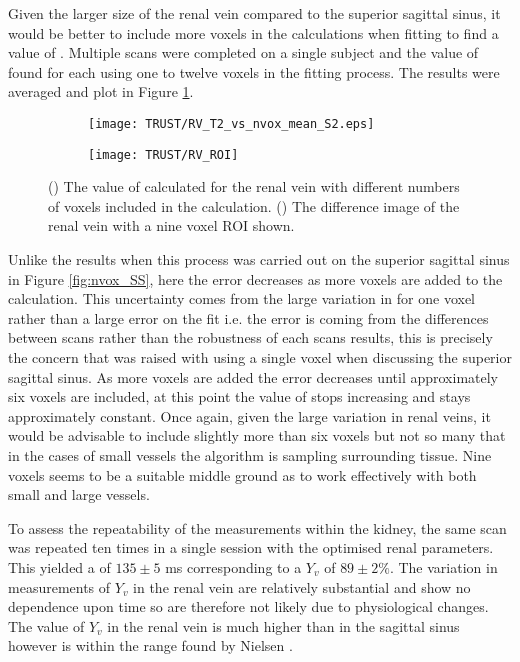 Given the larger size of the renal vein compared to the superior sagittal sinus, it would be better to include more voxels in the calculations when fitting to find a value of \ttwo. Multiple scans were completed on a single subject and the value of \ttwo found for each using one to twelve voxels in the fitting process. The results were averaged and plot in Figure \ref{fig:nvox_RV}.

\begin{figure}[H]
	\centering
	\begin{subfigure}[c]{0.47\textwidth}
		\centering
		\texttt{[image: TRUST/RV\_T2\_vs\_nvox\_mean\_S2.eps]}
		\caption{}
		\label{fig:nvox_RV}
	\end{subfigure}
	\hfill
	\begin{subfigure}[c]{0.47\textwidth}
		\centering
		\texttt{[image: TRUST/RV\_ROI]}
		\caption{}
		\label{fig:RV_ROI}
	\end{subfigure}
	\caption{() The value of \ttwo calculated for the renal vein with different numbers of voxels included in the calculation. () The difference image of the renal vein with a nine voxel \ac{ROI} shown.}
	\label{fig:nv_RV}
\end{figure}


Unlike the results when this process was carried out on the superior sagittal sinus in Figure \ref{fig:nvox_SS}, here the error decreases as more voxels are added to the calculation. This uncertainty comes from the large variation in \ttwo for one voxel rather than a large error on the fit i.e. the error is coming from the differences between scans rather than the robustness of each scans results, this is precisely the concern that was raised with using a single voxel when discussing the superior sagittal sinus. As more voxels are added the error decreases until approximately six voxels are included, at this point the value of \ttwo stops increasing and stays approximately constant. Once again, given the large variation in renal veins, it would be advisable to include slightly more than six voxels but not so many that in the cases of small vessels the algorithm is sampling surrounding tissue. Nine voxels seems to be a suitable middle ground as to work effectively with both small and large vessels.

To assess the repeatability of the measurements within the kidney, the same scan was repeated ten times in a single session with the optimised renal parameters. This yielded a \ttwo of $135\pm5$ ms corresponding to a $Y_v$ of $89\pm2\%$. The variation in measurements of $Y_v$ in the renal vein are relatively substantial and show no dependence upon time so are therefore not likely due to physiological changes. The value of $Y_v$ in the renal vein is much higher than in the sagittal sinus however is within the range found by Nielsen \cite{nielsen_renal_1992}.

